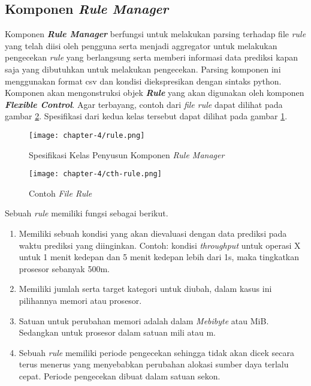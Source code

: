 \subsection{Komponen \textit{Rule Manager}}
Komponen \textbf{\textit{Rule Manager}} berfungsi untuk melakukan parsing terhadap file \textit{rule} yang telah diisi oleh pengguna serta menjadi aggregator untuk melakukan pengecekan \textit{rule} yang berlangsung serta memberi informasi data prediksi kapan saja yang dibutuhkan untuk melakukan pengecekan. Parsing komponen ini menggunakan format csv dan kondisi diekspresikan dengan sintaks python. Komponen akan mengonstruksi objek \textbf{\textit{Rule}} yang akan digunakan oleh komponen \textbf{\textit{Flexible Control}}. Agar terbayang, contoh dari \textit{file rule} dapat dilihat pada gambar \ref{fig:rule-example}. Spesifikasi dari kedua kelas tersebut dapat dilihat pada gambar \ref{fig:rule-spek}.

\begin{figure}[h]
    \centering
    \texttt{[image: chapter-4/rule.png]}
    \caption{Spesifikasi Kelas Penyusun Komponen \textit{Rule Manager}}
    \label{fig:rule-spek}
\end{figure}

\begin{figure}[h]
    \centering
    \texttt{[image: chapter-4/cth-rule.png]}
    \caption{Contoh \textit{File Rule}}
    \label{fig:rule-example}
\end{figure}


Sebuah \textit{rule} memiliki fungsi sebagai berikut.
\begin{enumerate}
    \item Memiliki sebuah kondisi yang akan dievaluasi dengan data prediksi pada waktu prediksi yang diinginkan. Contoh: kondisi \textit{throughput} untuk operasi X untuk 1 menit kedepan dan 5 menit kedepan lebih dari 1s, maka tingkatkan prosesor sebanyak 500m.
    \item Memiliki jumlah serta target kategori untuk diubah, dalam kasus ini pilihannya memori atau prosesor.
    \item Satuan untuk perubahan memori adalah dalam \textit{Mebibyte} atau MiB. Sedangkan untuk prosesor dalam satuan mili atau m.
    \item Sebuah \textit{rule} memiliki periode pengecekan sehingga tidak akan dicek secara terus menerus yang menyebabkan perubahan alokasi sumber daya terlalu cepat. Periode pengecekan dibuat dalam satuan sekon.
\end{enumerate}

